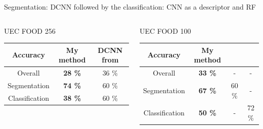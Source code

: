 \documentclass[aspectratio=169]{beamer}
\newenvironment{myframe}[1][t]{\begin{frame}[#1]{\secname}{\subsecname}}{\end{frame}}
\begin{document}
    \begin{myframe}
        Segmentation: DCNN followed by the classification: CNN as a descriptor and RF
        
        \begin{columns}
            \begin{center}
                UEC FOOD 256
                \vspace{0.5cm}
                
                \renewcommand{\arraystretch}{1.3} %
                \begin{tabulary}{\textwidth}{|| c | C C||}
                    \hline
                    Accuracy & My method & DCNN from \cite{Bolanos2016} \\
                    \hline\hline
                    Overall & \textbf{28 \%} & 36 \% \\ 
                    \hline
                    Segmentation &  \textbf{74 \%} & 60 \% \\
                    \hline
                    Classification &  \textbf{38 \%} & 60 \% \\
                    \hline
                \end{tabulary}
            \end{center}
            
            \begin{center}
                UEC FOOD 100
                \vspace{0.5cm}
                
                \renewcommand{\arraystretch}{1.3} %
                \begin{tabulary}{\textwidth}{|| C | C c c||} 
                    \hline
                    Accuracy & My method & \cite{Shimoda2015} & \cite{Kawano2014} \\
                    \hline\hline
                    Overall & \textbf{33 \%} & - & - \\ 
                    \hline
                    Segmentation &  \textbf{67 \%} & 60 \% & - \\
                    \hline
                    Classification &  \textbf{50 \%} & -  & 72 \% \\
                    \hline
                \end{tabulary}
            \end{center}
        \end{columns}
    \end{myframe}
    
\end{document}
